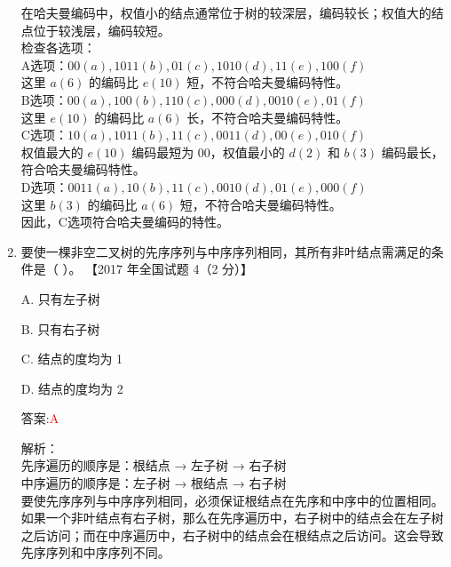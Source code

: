 \documentclass[lang=cn,newtx,10pt,scheme=chinese]{../../../elegantbook}
\begin{document}
\begin{enumerate}
        在哈夫曼编码中，权值小的结点通常位于树的较深层，编码较长；权值大的结点位于较浅层，编码较短。\\
        
        检查各选项：\\
        A选项：$00(a), 1011(b), 01(c), 1010(d), 11(e), 100(f)$\\
        这里 $a(6)$ 的编码比 $e(10)$ 短，不符合哈夫曼编码特性。\\
        
        B选项：$00(a), 100(b), 110(c), 000(d), 0010(e), 01(f)$\\
        这里 $e(10)$ 的编码比 $a(6)$ 长，不符合哈夫曼编码特性。\\
        
        C选项：$10(a), 1011(b), 11(c), 0011(d), 00(e), 010(f)$\\
        权值最大的 $e(10)$ 编码最短为 $00$，权值最小的 $d(2)$ 和 $b(3)$ 编码最长，符合哈夫曼编码特性。\\
        
        D选项：$0011(a), 10(b), 11(c), 0010(d), 01(e), 000(f)$\\
        这里 $b(3)$ 的编码比 $a(6)$ 短，不符合哈夫曼编码特性。\\
        
        因此，C选项符合哈夫曼编码的特性。\\
    
        \item 要使一棵非空二叉树的先序序列与中序序列相同，其所有非叶结点需满足的条件是（ ）。  
        【2017 年全国试题 4（2 分）】  
    
        A. 只有左子树  
    
        B. 只有右子树  
    
        C. 结点的度均为 1  
    
        D. 结点的度均为 2  
    
        答案:\textcolor{red}{A}
        
        解析：\\
        先序遍历的顺序是：根结点 → 左子树 → 右子树\\
        中序遍历的顺序是：左子树 → 根结点 → 右子树\\
        
        要使先序序列与中序序列相同，必须保证根结点在先序和中序中的位置相同。\\
        
        如果一个非叶结点有右子树，那么在先序遍历中，右子树中的结点会在左子树之后访问；而在中序遍历中，右子树中的结点会在根结点之后访问。这会导致先序序列和中序序列不同。\\
        

\end{enumerate}
\end{document}
